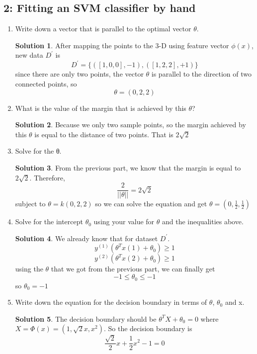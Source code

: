 \documentclass[]{book}
\theoremstyle{definition}
\newtheorem*{soln}{Solution}
\begin{document}
\subsection*{2: Fitting an SVM classifier by hand}
\begin{enumerate}
	\item Write down a vector that is parallel to the optimal vector $\theta$.
	\begin{soln}
	After mapping the points to the 3-D using feature vector $\phi(x)$, new data $D^{'}$ is
	$$D^{'} = \{([1,0,0],-1),([1,2,2],+1)\}$$
	since there are only two points, the vector	$\theta$ is parallel to the direction of two connected points, so 
	$$\theta = (0,2,2)$$
	
	\end{soln}
	\item What is the value of the margin that is achieved by this $\theta$?
	\begin{soln}
		Because we only two sample points, so the margin achieved by this $\theta$ is equal to the distance of two points. That is $2\sqrt{2}$
	\end{soln}
	\item Solve for the θ.
	\begin{soln}
		From the previous part, we know that the margin is equal to $2\sqrt{2}$. Therefore,
		$$\frac{2}{||\theta||} = 2\sqrt{2}$$
		subject to $\theta = k(0,2,2)$ 
		so we can solve the equation and get $\theta = (0,\frac{1}{2},\frac{1}{2})$
		
	\end{soln}
	\item Solve for the intercept $\theta_0$ using your value for $\theta$ and the inequalities above.
	\begin{soln}
		We already know that for dataset $D^{'}$.
		$$y^{(1)}(\theta^T x{(1)}+ \theta_0)\geq1$$
		$$y^{(2)}(\theta^T x{(2)}+ \theta_0)\geq1$$
		using the $\theta$ that we got from the previous part, we can finally get
		$$ -1\leq\theta_0\leq -1$$
		so $\theta_0 = -1$
		
	\end{soln}
	\item Write down the equation for the decision boundary in terms of $\theta$, $\theta_0$ and x.
	\begin{soln}
		The decision boundary should be $\theta^T X + \theta_0 = 0$
		where $X = \varPhi(x) = (1,\sqrt{2}x,x^2)$.
		So the decision boundary is 
		$$\frac{\sqrt{2}}{2} x + \frac{1}{2} x^2 -1 = 0$$
	\end{soln}
	
\end{enumerate}
\end{document}
